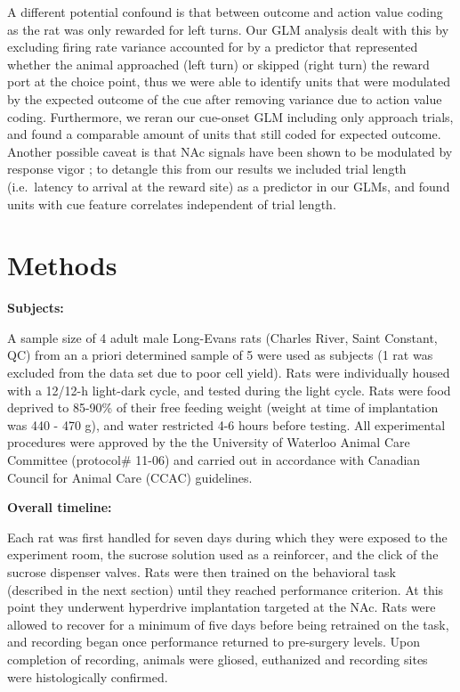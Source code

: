 \documentclass[11pt]{article}
\let\cite=\citep
\begin{document}
A different potential confound is that between outcome and action
value coding as the rat was only rewarded for left turns. Our GLM
analysis dealt with this by excluding firing rate variance accounted
for by a predictor that represented whether the animal approached
(left turn) or skipped (right turn) the reward port at the choice
point, thus we were able to identify units that were modulated by the
expected outcome of the cue after removing variance due to action
value coding. Furthermore, we reran our cue-onset GLM including only
approach trials, and found a comparable amount of units that still
coded for expected outcome. Another possible caveat is that NAc
signals have been shown to be modulated by response vigor
\cite{McGinty2013}; to detangle this from our results we included
trial length (i.e.\ latency to arrival at the reward site) as a
predictor in our GLMs, and found units with cue feature correlates
independent of trial length.

\section*{Methods}

{\bf Subjects:}

A sample size of 4 adult male Long-Evans rats (Charles River, Saint
Constant, QC) from an a priori determined sample of 5 were used as
subjects (1 rat was excluded from the data set due to poor cell
yield). Rats were individually housed with a 12/12-h light-dark cycle,
and tested during the light cycle. Rats were food deprived to 85-90\%
of their free feeding weight (weight at time of implantation was 440 -
470 g), and water restricted 4-6 hours before testing. All
experimental procedures were approved by the the University of
Waterloo Animal Care Committee (protocol\# 11-06) and carried out in
accordance with Canadian Council for Animal Care (CCAC) guidelines.

{\bf Overall timeline:}

Each rat was first handled for seven days during which they were
exposed to the experiment room, the sucrose solution used as a
reinforcer, and the click of the sucrose dispenser valves. Rats were
then trained on the behavioral task (described in the next section)
until they reached performance criterion. At this point they
underwent hyperdrive implantation targeted at the NAc. Rats were
allowed to recover for a minimum of five days before being retrained
on the task, and recording began once performance returned to
pre-surgery levels. Upon completion of recording, animals were gliosed,
euthanized and recording sites were histologically confirmed.
\end{document}
